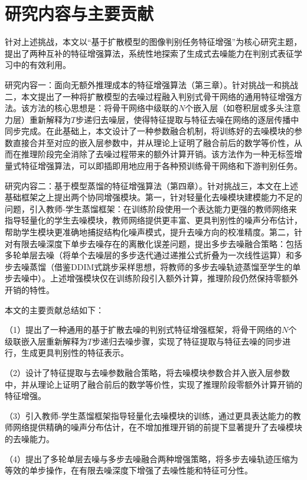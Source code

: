 \section{研究内容与主要贡献}

针对上述挑战，本文以``基于扩散模型的图像判别任务特征增强''为核心研究主题，提出了两种互补的特征增强算法，系统性地探索了生成式去噪能力在判别式表征学习中的有效利用。

研究内容一：面向无额外推理成本的特征增强算法（第三章）。针对挑战一和挑战二，本文提出了一种将扩散模型的去噪过程融入判别式骨干网络的通用特征增强方法。该方法的核心思想是：将骨干网络中级联的$N$个嵌入层（如卷积层或多头注意力层）重新解释为$T$步递归去噪层，使得特征提取与特征去噪在网络的逐层传播中同步完成。在此基础上，本文设计了一种参数融合机制，将训练好的去噪模块的参数直接合并至对应的嵌入层参数中，并从理论上证明了融合前后的数学等价性，从而在推理阶段完全消除了去噪过程带来的额外计算开销。该方法作为一种无标签增量式特征增强算法，可以即插即用地应用于各种预训练骨干网络和下游判别任务。

研究内容二：基于模型蒸馏的特征增强算法（第四章）。针对挑战三，本文在上述基础框架之上提出两个协同增强模块。第一，针对轻量化去噪模块建模能力不足的问题，引入教师-学生蒸馏框架：在训练阶段使用一个表达能力更强的教师网络来指导轻量化的学生去噪模块，教师网络提供更丰富、更具判别性的噪声分布估计，帮助学生模块更准确地捕捉结构化噪声模式，提升去噪方向的校准精度。第二，针对有限去噪深度下单步去噪存在的离散化误差问题，提出多步去噪融合策略：包括多轮单层去噪（将单个去噪层的多步迭代通过递推公式折叠为一次线性运算）和多步去噪蒸馏（借鉴DDIM\cite{song2020denoising}式跳步采样思想，将教师的多步去噪轨迹蒸馏至学生的单步去噪中）。上述增强模块仅在训练阶段引入额外计算，推理阶段仍然保持零额外开销的特性。

本文的主要贡献总结如下：

（1）提出了一种通用的基于扩散去噪的判别式特征增强框架，将骨干网络的$N$个级联嵌入层重新解释为$T$步递归去噪步骤，实现了特征提取与特征去噪的同步进行，生成更具判别性的特征表示。

（2）设计了特征提取与去噪参数融合策略，将去噪模块参数合并入嵌入层参数中，并从理论上证明了融合前后的数学等价性，实现了推理阶段零额外计算开销的特征增强。

（3）引入教师-学生蒸馏框架指导轻量化去噪模块的训练，通过更具表达能力的教师网络提供精确的噪声分布估计，在不增加推理开销的前提下显著提升了去噪模块的去噪能力。

（4）提出了多轮单层去噪与多步去噪融合两种增强策略，将多步去噪轨迹压缩为等效的单步操作，在有限去噪深度下增强了去噪性能和特征可分性。

